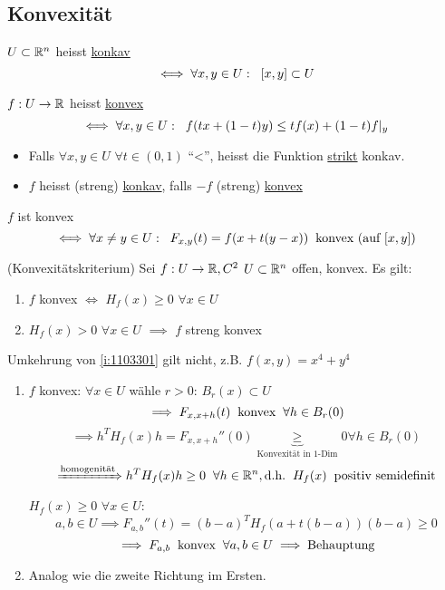 \subsection{Konvexität}
\begin{Def}
  $U\subset\mathbb{R}^n$ heisst \ul{konkav}
  \[\iff \forall x,y\in U: \hspace{2mm} \left[ x,y \right]\subset U\]
\end{Def}
\begin{Def}
  $f:U\rightarrow\mathbb{R}$ heisst \ul{konvex}
  \[\iff \forall x,y\in U:\hspace{2mm} f(tx+(1-t)y)\leq tf(x)+(1-t)f|_y\]
  \begin{itemize}
    \item Falls $\forall x,y\in U$ $\forall t\in (0,1)$ ``<'', heisst die Funktion \ul{strikt} konkav.
    \item $f$ heisst (streng) \ul{konkav}, falls $-f$ (streng) \ul{konvex}
  \end{itemize}
\end{Def}
\begin{Bem}
  $f$ ist konvex
  \[\iff \forall x\neq y\in U:\hspace{2mm} F_{x,y}(t)=f(x+t(y-x))\hspace{2mm}\text{konvex (auf $\left[ x,y \right]$)}\]
\end{Bem}
\begin{Sat}
  (Konvexitätskriterium)
  Sei $f:U\rightarrow\mathbb{R}, C^2$ $U\subset\mathbb{R}^n$ offen, konvex. Es gilt:
  \begin{enumerate}
    \item $f$ konvex $\iff$ $H_f(x)\geq 0$ $\forall x\in U$
      \label{i:1103301}
    \item $H_f(x)>0$ $\forall x\in U$ $\implies$ $f$ streng konvex
      \label{i:1103302}
  \end{enumerate}
\end{Sat}
\begin{Bem}
  Umkehrung von \ref{i:1103301} gilt nicht, z.B. $f(x,y)=x^4+y^4$
\end{Bem}
\begin{Bew}
  \begin{enumerate}
    \item $f$ konvex: $\forall x\in U$ wähle $r>0$: $B_r(x)\subset U$
      \[\implies F_{x,x+h}(t)\hspace{2mm}\text{konvex}\hspace{2mm}\forall h\in B_r(0)\]
      \[\implies h^TH_f(x)h=F_{x,x+h}''(0)\underbrace{\geq}_{\text{Konvexität in 1-Dim}} 0\forall h\in B_r(0)\]
      \[\xRightarrow{\text{homogenität}}h^TH_f(x)h\geq 0\hspace{2mm}\forall h\in \mathbb{R}^n, \text{d.h.}\hspace{2mm} H_f(x)\hspace{2mm}\text{positiv semidefinit}\]
      $H_f(x)\geq 0$ $\forall x\in U$:
      \[a,b\in U\implies F_{a,b}''(t)=(b-a)^TH_f(a+t(b-a))(b-a)\geq 0\]
      \[\implies F_{a,b} \hspace{2mm}\text{konvex}\hspace{2mm}\forall a,b\in U\implies\text{Behauptung}\]
    \item Analog wie die zweite Richtung im Ersten.
  \end{enumerate}
\end{Bew}
